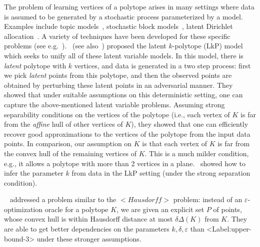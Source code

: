 \documentclass[11pt,letterpaper]{article}
\def\mathsf#1{<#1>}%
\def\xspace{}%
\def\Cref#1{<Label:#1>}%
\theoremstyle{definition}
\theoremstyle{remark}
\newcommand{\Hausdorf}{\mathsf {Hausdorff}\xspace }
\begin{document}
The problem of learning vertices of a polytope arises in many settings where data is assumed to be generated by a stochastic process parameterized by a model. Examples include topic models~\cite{Blei12}, stochastic block models~\cite{AiroldiBEF14}, latent Dirichlet allocation~\cite{BleiNJ03}. A variety of techniques have been developed for these specific problems (see e.g.~\cite{AnandkumarFHKL15, AroraGHMMSWZ18,HopkinsS17}).~\cite{BhattacharyyaK20} (see also~\cite{BakshiBKWZ21}) proposed the latent $k$-polytope (LkP) model which seeks to unify all of these latent variable models. In this model, there is {\em latent} polytope with $k$ vertices, and data is generated in a two step process: first we pick {\em latent} points from this polytope, and then the observed points are obtained by perturbing these latent points in an adversarial manner. They showed that under suitable assumptions on this deterministic setting, one can capture the above-mentioned latent variable problems. Assuming strong separability conditions on the vertices of the polytope (i.e., each vertex of $K$ is far from the {\em affine} hull of other vertices of $K$), they showed that one can efficiently  recover good approximations to the vertices of the polytope from the input data points. In comparison, our assumption on $K$ is that each vertex of $K$ is far from the convex hull of the remaining vertices of $K$. This is a much milder condition, e.g., it allows a polytope with more than 2 vertices in a plane.~\cite{BhattacharyyaK021} showed how to infer the parameter $k$ from data in the LkP setting (under the strong separation condition). 

~\cite{BlumHR19} addressed a problem similar to the $\Hausdorf$ problem: instead of an $\varepsilon$-optimization oracle for a polytope $K$, we are given an explicit set $P$ of points, whose convex hull is within  Hausdorff distance at most $\delta\Delta(K)$ from $K$. They are able to get better dependencies on the parameters $k,\delta,\varepsilon$ than \Cref{upper-bound-3} under these stronger assumptions. 
\end{document}
